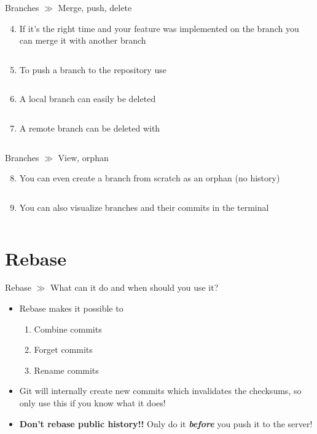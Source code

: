 \documentclass[10pt]{beamer}
\begin{document}
\begin{frame}{Branches $\gg$ Merge, push, delete}
	\begin{enumerate}\setcounter{enumi}{3}
		\item If it's the right time and your feature was implemented on the branch you can merge it with another branch
		\inputminted[bgcolor=lightGreyCustom,fontsize=\scriptsize]{sh}{./resources/git_branches_04_merge.sh}
		\item To push a branch to the repository use
		\inputminted[bgcolor=lightGreyCustom,fontsize=\scriptsize]{sh}{./resources/git_branches_05_push.sh}
		\item A local branch can easily be deleted
		\inputminted[bgcolor=lightGreyCustom,fontsize=\scriptsize]{sh}{./resources/git_branches_06_delete.sh}
		\item A remote branch can be deleted with
		\inputminted[bgcolor=lightGreyCustom,fontsize=\scriptsize]{sh}{./resources/git_branches_07_delete_remote.sh}
	\end{enumerate}
\end{frame}

\begin{frame}{Branches $\gg$ View, orphan}
	\begin{enumerate}\setcounter{enumi}{7}
		\item You can even create a branch from scratch as an orphan (no history)
		\inputminted[bgcolor=lightGreyCustom,fontsize=\scriptsize]{sh}{./resources/git_branches_08_orphan.sh}
		\item You can also visualize branches and their commits in the terminal
		\inputminted[bgcolor=lightGreyCustom,fontsize=\scriptsize]{sh}{./resources/git_branches_09_log.sh}
	\end{enumerate}
\end{frame}

\section{Rebase}

\begin{frame}{Rebase $\gg$ What can it do and when should you use it?}
	\begin{itemize}
		\item Rebase makes it possible to
		\begin{enumerate}
			\item Combine commits
			\item Forget commits
			\item Rename commits
		\end{enumerate}
		\item Git will internally create new commits which invalidates the checksums, so only use this if you know what it does!
		\item \textbf{Don't rebase public history!!} Only do it \textbf{\textit{before}} you push it to the server!
	\end{itemize}
\end{frame}
\end{document}
